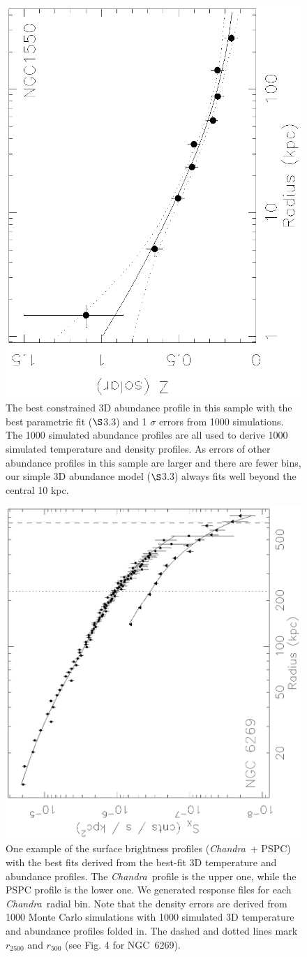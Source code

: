\documentclass{aastex}
\def\chandra    {{\em Chandra}\/}
\begin{document}
\begin{figure}
\centerline{\includegraphics[height=0.5\linewidth,angle=270]{f6.ps}}
  \caption{The best constrained 3D abundance profile in this sample with the best
parametric fit ($\S$3.3) and 1 $\sigma$ errors from 1000 simulations. 
The 1000 simulated abundance profiles are all
used to derive 1000 simulated temperature and density profiles.
As errors of other abundance profiles in this sample are larger and there are
fewer bins, our simple 3D abundance model ($\S$3.3) always fits well
beyond the central 10 kpc.
}
\end{figure}

\begin{figure}
\centerline{\includegraphics[height=0.5\linewidth,angle=270]{f7.ps}}
  \caption{One example of the surface brightness profiles (\chandra\ +
PSPC) with the best fits derived from the best-fit 3D temperature and abundance profiles.
The \chandra\ profile is the upper one, while the PSPC profile is the lower one.
We generated response files for each \chandra\ radial bin.
Note that the density errors are derived from 1000 Monte Carlo simulations
with 1000 simulated 3D temperature and abundance profiles folded in.
The dashed and dotted lines mark $r_{2500}$ and $r_{500}$ (see Fig. 4 for NGC~6269).
}
\end{figure}
\clearpage
\end{document}
